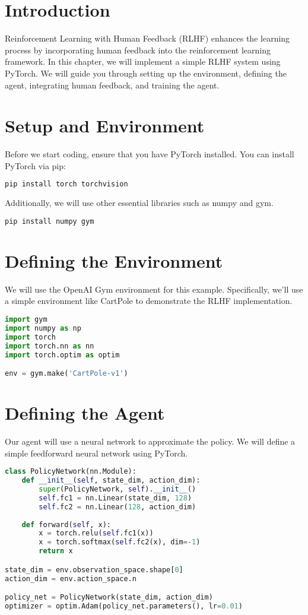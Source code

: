 \section{Introduction}
Reinforcement Learning with Human Feedback (RLHF) enhances the learning process by incorporating human feedback into the reinforcement learning framework. In this chapter, we will implement a simple RLHF system using PyTorch. We will guide you through setting up the environment, defining the agent, integrating human feedback, and training the agent.

\section{Setup and Environment}
Before we start coding, ensure that you have PyTorch installed. You can install PyTorch via pip:

\begin{lstlisting}[language=bash]
pip install torch torchvision
\end{lstlisting}

Additionally, we will use other essential libraries such as numpy and gym.

\begin{lstlisting}[language=bash]
pip install numpy gym
\end{lstlisting}

\section{Defining the Environment}
We will use the OpenAI Gym environment for this example. Specifically, we'll use a simple environment like CartPole to demonstrate the RLHF implementation.

\begin{lstlisting}[language=python]
import gym
import numpy as np
import torch
import torch.nn as nn
import torch.optim as optim

env = gym.make('CartPole-v1')
\end{lstlisting}

\section{Defining the Agent}
Our agent will use a neural network to approximate the policy. We will define a simple feedforward neural network using PyTorch.

\begin{lstlisting}[language=python]
class PolicyNetwork(nn.Module):
    def __init__(self, state_dim, action_dim):
        super(PolicyNetwork, self).__init__()
        self.fc1 = nn.Linear(state_dim, 128)
        self.fc2 = nn.Linear(128, action_dim)
    
    def forward(self, x):
        x = torch.relu(self.fc1(x))
        x = torch.softmax(self.fc2(x), dim=-1)
        return x

state_dim = env.observation_space.shape[0]
action_dim = env.action_space.n

policy_net = PolicyNetwork(state_dim, action_dim)
optimizer = optim.Adam(policy_net.parameters(), lr=0.01)
\end{lstlisting}

